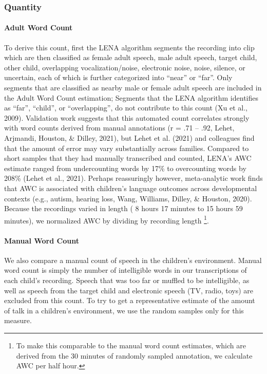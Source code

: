 \documentclass[
  man,floatsintext]{apa6}
\let\oldparagraph\paragraph
\renewcommand{\paragraph}[1]{\oldparagraph{#1}\mbox{}}
\begin{document}
\hypertarget{quantity}{%
\subsubsection{Quantity}\label{quantity}}

\hypertarget{adult-word-count}{%
\paragraph{Adult Word Count}\label{adult-word-count}}

To derive this count, first the LENA algorithm segments the recording into clip which are then classified as female adult speech, male adult speech, target child, other child, overlapping vocalization/noise, electronic noise, noise, silence, or uncertain, each of which is further categorized into ``near'' or ``far''. Only segments that are classified as nearby male or female adult speech are included in the Adult Word Count estimation; Segments that the LENA algorithm identifies as ``far'', ``child'', or ``overlapping'', do not contribute to this count (Xu et al., 2009). Validation work suggests that this automated count correlates strongly with word counts derived from manual annotations (r = .71 -- .92, Lehet, Arjmandi, Houston, \& Dilley, 2021), but Lehet et al. (2021) and colleagues find that the amount of error may vary substantially across families. Compared to short samples that they had manually transcribed and counted, LENA's AWC estimate ranged from undercounting words by 17\% to overcounting words by 208\% (Lehet et al., 2021). Perhaps reassuringly however, meta-analytic work finds that AWC is associated with children's language outcomes across developmental contexts (e.g., autism, hearing loss, Wang, Williams, Dilley, \& Houston, 2020). Because the recordings varied in length ( 8 hours 17 minutes to 15 hours 59 minutes), we normalized AWC by dividing by recording length \footnote{To make this comparable to the manual word count estimates, which are derived from the 30 minutes of randomly sampled annotation, we calculate AWC per half hour.}.

\hypertarget{manual-word-count}{%
\paragraph{Manual Word Count}\label{manual-word-count}}

We also compare a manual count of speech in the children's environment. Manual word count is simply the number of intelligible words in our transcriptions of each child's recording. Speech that was too far or muffled to be intelligible, as well as speech from the target child and electronic speech (TV, radio, toys) are excluded from this count. To try to get a representative estimate of the amount of talk in a children's environment, we use the random samples only for this measure.
\end{document}
